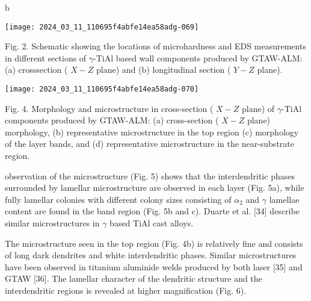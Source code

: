 \documentclass[10pt]{article}
\begin{document}
b

\begin{center}
\texttt{[image: 2024\_03\_11\_110695f4abfe14ea58adg-069]}
\end{center}

Fig. 2. Schematic showing the locations of microhardness and EDS measurements in different sections of $\gamma$-TiAl based wall components produced by GTAW-ALM: (a) crosssection ( $X-Z$ plane) and (b) longitudinal section ( $Y-Z$ plane).

\begin{center}
\texttt{[image: 2024\_03\_11\_110695f4abfe14ea58adg-070]}
\end{center}

Fig. 4. Morphology and microstructure in cross-section ( $X-Z$ plane) of $\gamma$-TiAl components produced by GTAW-ALM: (a) cross-section ( $X-Z$ plane) morphology, (b) representative microstructure in the top region (c) morphology of the layer bands, and (d) representative microstructure in the near-substrate region.

observation of the microstructure (Fig. 5) shows that the interdendritic phases surrounded by lamellar microstructure are observed in each layer (Fig. 5a), while fully lamellar colonies with different colony sizes consisting of $\alpha_{2}$ and $\gamma$ lamellae content are found in the band region (Fig. 5b and c). Duarte et al. [34] describe similar microstructures in $\gamma$ based TiAl cast alloys.

The microstructure seen in the top region (Fig. 4b) is relatively fine and consists of long dark dendrites and white interdendritic phases. Similar microstructures have been observed in titanium aluminide welds produced by both laser [35] and GTAW [36]. The lamellar character of the dendritic structure and the interdendritic regions is revealed at higher magnification (Fig. 6).
\end{document}
